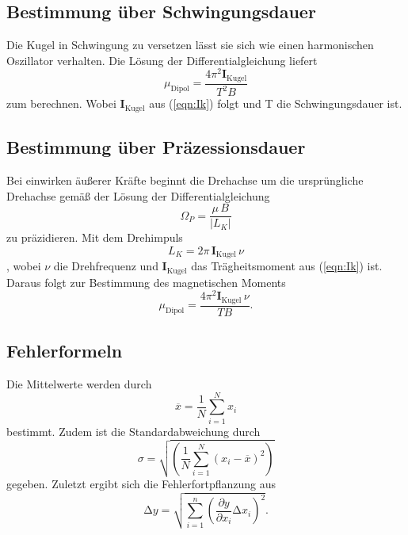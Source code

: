 \subsection{Bestimmung über Schwingungsdauer}
Die Kugel in Schwingung zu versetzen lässt sie sich wie einen
harmonischen Oszillator verhalten. Die Lösung der Differentialgleichung
liefert
\begin{equation}
  \mu_\text{Dipol}=\frac{4\pi^2\symbf{I}_\text{Kugel}}{T^2B}
  \label{eqn:pendel}
\end{equation}
zum berechnen. Wobei $\symbf{I}_\text{Kugel}$ aus (\ref{eqn:Ik}) folgt
und T die Schwingungsdauer ist.

\subsection{Bestimmung über Präzessionsdauer}
Bei einwirken äußerer Kräfte beginnt die Drehachse um die
ursprüngliche Drehachse gemäß der Lösung der
Differentialgleichung
\begin{equation}
  \Omega_P = \frac{\mu\,B}{\vert{L_K}\vert}
\end{equation}
zu präzidieren. Mit dem Drehimpuls
\begin{equation}
  L_K = 2\pi\,\symbf{I}_\text{Kugel}\,\nu
\end{equation}
, wobei $\nu$ die Drehfrequenz und
 $\symbf{I}_\text{Kugel}$ das Trägheitsmoment aus (\ref{eqn:Ik}) ist.
 Daraus folgt zur Bestimmung des magnetischen Moments
 \begin{equation}
   \mu_\text{Dipol}=\frac{4\pi^2\symbf{I}_\text{Kugel}\,\nu}{TB}
   \label{eqn:strobo}.
 \end{equation}

\subsection{Fehlerformeln}
Die Mittelwerte werden durch
\begin{equation}
  \overline{x} =\frac{1}{N}\sum_{i=1}^{N} x_i
  \label{eqn:mean}
\end{equation}
bestimmt.
Zudem ist die Standardabweichung durch
\begin{equation}
  \sigma = \sqrt{\left(\frac{1}{N}\sum_{i=1}^{N}(x_i-\overline{x})^2\right)}
  \label{eqn:std}
\end{equation}
 gegeben.
 Zuletzt ergibt sich die Fehlerfortpflanzung aus
 \begin{equation}
  \increment y = \sqrt{\sum_{i=1}^{n}\left(\frac{\partial y}{\partial x_i}
  \increment x_i\right)^2}
  \label{eqn:gauss}.
 \end{equation}
